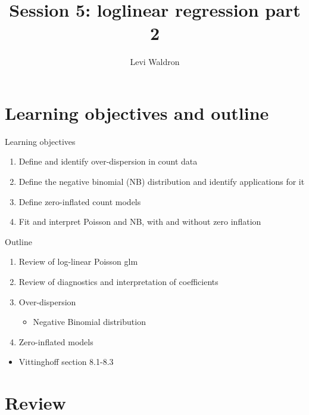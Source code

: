 \documentclass[
  ignorenonframetext,
]{beamer}
\title{Session 5: loglinear regression part 2}
\author{Levi Waldron}
\date{}
\institute{CUNY SPH Biostatistics 2}
\providecommand{\tightlist}{%
  \setlength{\itemsep}{0pt}\setlength{\parskip}{0pt}}
\begin{document}
\frame{\titlepage}

\hypertarget{learning-objectives-and-outline}{%
\section{Learning objectives and
outline}\label{learning-objectives-and-outline}}

\begin{frame}{Learning objectives}
\protect\hypertarget{learning-objectives}{}

\begin{enumerate}
\tightlist
\item
  Define and identify over-dispersion in count data
\item
  Define the negative binomial (NB) distribution and identify
  applications for it
\item
  Define zero-inflated count models
\item
  Fit and interpret Poisson and NB, with and without zero inflation
\end{enumerate}

\end{frame}

\begin{frame}{Outline}
\protect\hypertarget{outline}{}

\begin{enumerate}
\tightlist
\item
  Review of log-linear Poisson glm
\item
  Review of diagnostics and interpretation of coefficients
\item
  Over-dispersion

  \begin{itemize}
  \tightlist
  \item
    Negative Binomial distribution
  \end{itemize}
\item
  Zero-inflated models
\end{enumerate}

\begin{itemize}
\tightlist
\item
  Vittinghoff section 8.1-8.3
\end{itemize}

\end{frame}

\hypertarget{review}{%
\section{Review}\label{review}}
\end{document}
